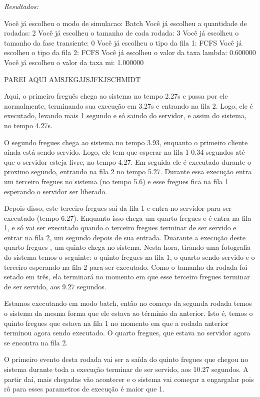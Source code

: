 \documentclass[a4paper,10pt]{article}
\begin{document}
\emph{Resultados:}

Você já escolheu o modo de simulacao: Batch
Você já escolheu a quantidade de rodadas: 2
Você já escolheu o tamanho de cada rodada: 3
Você já escolheu o tamanho da fase transiente: 0
Você já escolheu o tipo da fila 1: FCFS
Você já escolheu o tipo da fila 2: FCFS
Você já escolheu o valor da taxa lambda: 0.600000
Você já escolheu o valor da taxa mi: 1.000000

PAREI AQUI AMSJKGJJSJFKJSCHMIDT


    Aqui, o primeiro freguês chega ao sistema no tempo 2.27s e passa por ele normalmente, terminando sua execução em 3.27s e entrando na fila 2. Logo, ele é executado, levando mais 1 segundo e só saindo do servidor, e assim do sistema, no tempo 4.27s.

    O segundo fregues chega ao sistema no tempo 3.93, enquanto o primeiro cliente ainda está sendo servido. Logo, ele tem que esperar na fila 1 0.34 segundos até que o servidor esteja livre, no tempo 4.27. Em seguida ele é executado durante o proximo segundo, entrando na fila 2 no tempo 5.27. Durante essa execução entra um terceiro fregues no sistema (no tempo 5.6) e esse fregues fica na fila 1 esperando o servidor ser liberado.

Depois disso, este terceiro fregues sai da fila 1 e entra no servidor para ser executado (tempo 6.27). Enquanto isso chega um quarto fregues e é entra na fila 1, e só vai ser executado quando o terceiro fregues terminar de ser servido e entrar na fila 2, um segundo depois de sua entrada. Duarante a execução deste quarto fregues , um quinto chega no sistema. Nesta hora, tirando uma fotografia do sistema temos o seguinte: o quinto fregues na fila 1, o quarto sendo servido e o terceiro esperando na fila 2 para ser executado. Como o tamanho da rodada foi setado em três, ela terminará no momento em que esse terceiro fregues terminar de ser servido, aos 9.27 segundos.

Estamos executando em modo batch, então no começo da segunda rodada temos o sistema da mesma forma que ele estava ao términio da anterior. Isto é, temos o quinto fregues que estava na fila 1 no momento em que a rodada anterior terminou agora sendo executado. O quarto fregues, que estava no servidor agora se encontra na fila 2.

O primeiro evento desta rodada vai ser a saída do quinto fregues que chegou no sistema durante toda a execução terminar de ser servido, aos 10.27 segundos. A partir daí, mais chegadas vão acontecer e o sistema vai começar a engargalar pois rô para esses parametros de execução é maior que 1.
\end{document}
